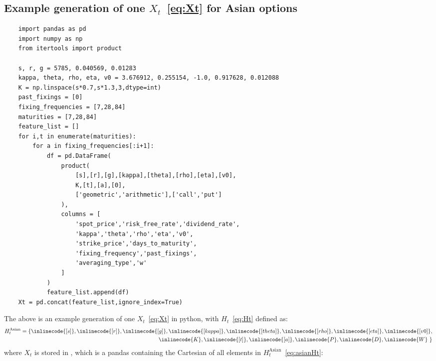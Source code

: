 \subsection{Example generation of one $X_{t}$~\eqref{eq:Xt} for Asian options}
\begin{lstlisting}
	import pandas as pd
	import numpy as np
	from itertools import product
	
	s, r, g = 5785, 0.040569, 0.01283
	kappa, theta, rho, eta, v0 = 3.676912, 0.255154, -1.0, 0.917628, 0.012088
	K = np.linspace(s*0.7,s*1.3,3,dtype=int)
	past_fixings = [0]
	fixing_frequencies = [7,28,84]
	maturities = [7,28,84]
	feature_list = []
	for i,t in enumerate(maturities):
		for a in fixing_frequencies[:i+1]:
			df = pd.DataFrame(
				product(
					[s],[r],[g],[kappa],[theta],[rho],[eta],[v0],
					K,[t],[a],[0],
					['geometric','arithmetic'],['call','put']
				),
				columns = [
					'spot_price','risk_free_rate','dividend_rate',
					'kappa','theta','rho','eta','v0',
					'strike_price','days_to_maturity',
					'fixing_frequency','past_fixings',
					'averaging_type','w'
				]
			)
			feature_list.append(df)
	Xt = pd.concat(feature_list,ignore_index=True)
\end{lstlisting}
The above is an example generation of one $X_{t}$~\eqref{eq:Xt} in python, with $H_{t}$~\eqref{eq:Ht} defined as:
\begin{equation}
	\begin{aligned}
		H_{t}^{\text{Asian}} = \{ \inlinecode{[s]}, \inlinecode{[r]}, \inlinecode{[g]}, \inlinecode{[kappa]}, \inlinecode{[theta]}, \inlinecode{[rho]}, \inlinecode{[eta]}, \inlinecode{[v0]}, \\ \inlinecode{K},  \inlinecode{[t]}, \inlinecode{[a]}, \inlinecode{P}, \inlinecode{D}, \inlinecode{W}\ \}
		\label{eq:asianHt}
	\end{aligned}
\end{equation}
where $X_{t}$ is stored in , which is a pandas  containing the Cartesian  of all elements in $H_{t}^{\text{Asian}}$~\eqref{eq:asianHt}: \\
